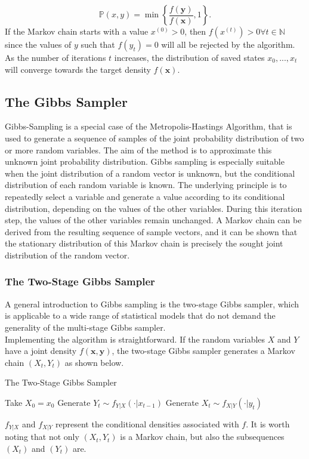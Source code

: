 \begin{equation*}
     \mathbb{P}\left(x,y\right) = \min\left\lbrace\frac{f\left(\pmb{y}\right)}{f\left(\pmb{x}\right)}, 1\right\rbrace.
\end{equation*}
If the Markov chain starts with a value $x^{(0)} > 0$, then $f\left(x^{(t)}\right) > 0 \forall t\in\mathbb{N}$ since the values of $y$ such that $f\left(y_t\right) = 0$ will all be rejected by the algorithm. As the number of iterations $t$ increases, the distribution of saved states $x_0,...,x_t$ will converge towards the target density $f(\pmb{x})$\autocite[Cf.][]{robert2013monte}.
\subsection{The Gibbs Sampler}
Gibbs-Sampling is a special case of the Metropolis-Hastings Algorithm, that is used to generate a sequence of samples of the joint probability distribution of two or more random variables. The aim of the method is to approximate this unknown joint probability distribution. Gibbs sampling is especially suitable when the joint distribution of a random vector is unknown, but the conditional distribution of each random variable is known. The underlying principle is to repeatedly select a variable and generate a value according to its conditional distribution, depending on the values of the other variables. During this iteration step, the values of the other variables remain unchanged. A Markov chain can be derived from the resulting sequence of sample vectors, and it can be shown that the stationary distribution of this Markov chain is precisely the sought joint distribution of the random vector.
\subsubsection{The Two-Stage Gibbs Sampler}
A general introduction to Gibbs sampling is the two-stage Gibbs sampler, which is applicable to a wide range of statistical models that do not demand the generality of the multi-stage Gibbs sampler. \\
Implementing the algorithm is straightforward. If the random variables $X$ and $Y$ have a joint density $f\left(\pmb{x},\pmb{y}\right)$, the two-stage Gibbs sampler generates a Markov chain $\left(X_t,Y_t\right)$ as shown below.
\begin{algorithm}
\caption{The Two-Stage Gibbs Sampler}
\begin{algorithmic}[1]
\Statex Take $X_0=x_0$
    \State Generate $Y_t\sim f_{Y|X}\left(\cdot|x_{t-1}\right)$
    \State Generate $X_t\sim f_{X|Y}\left(\cdot|y_t\right)$
    \EndFor
\end{algorithmic}
\end{algorithm} 
$f_{Y|X}$ and $f_{X|Y}$ represent the conditional densities associated with $f$. It is worth noting that not only $\left(X_t,Y_t\right)$ is a Markov chain, but also the subsequences $\left(X_t\right)$ and $\left(Y_t\right)$ are. 
